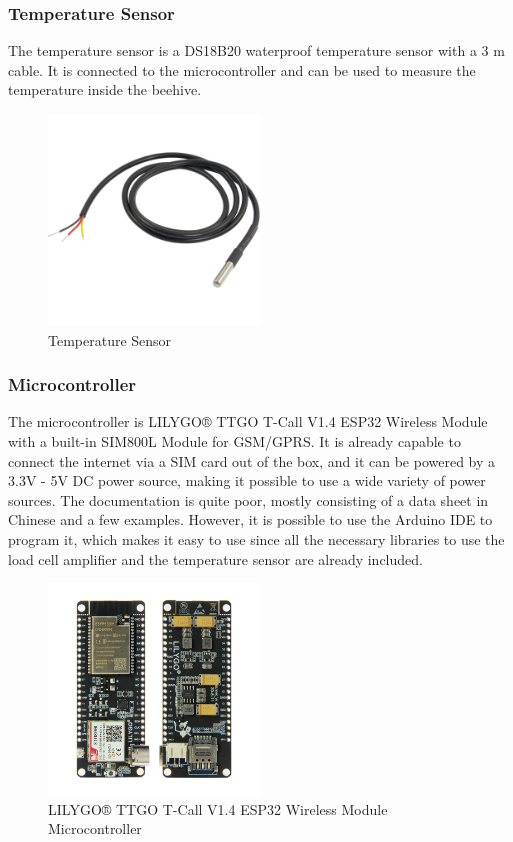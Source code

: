 \newpage
\subsubsection{Temperature Sensor}
The temperature sensor is a DS18B20 waterproof temperature sensor with a 3 m cable. It is connected to the microcontroller and can be used to measure the temperature inside the beehive.

\begin{figure}
    \centering
    \includegraphics[width=0.5\textwidth]{figures/DS18B20.png}
    \caption{Temperature Sensor}
    \label{fig:temperature_sensor}
\end{figure}
\newpage
\subsubsection{Microcontroller}
The microcontroller is LILYGO® TTGO T-Call V1.4 ESP32 Wireless Module with a built-in SIM800L Module for \Gls{GSM}/\Gls{GPRS}. It is already capable to connect the internet via a \Gls{SIM} card out of the box, and it can be powered by a 3.3V - 5V \Gls{DC} power source, making it possible to use a wide variety of power sources. The documentation is quite poor, mostly consisting of a data sheet in Chinese and a few examples. However, it is possible to use the \Gls{Arduino IDE} to program it, which makes it easy to use since all the necessary libraries to use the load cell amplifier and the temperature sensor are already included.

\begin{figure}
    \centering
    \includegraphics[width=0.5\textwidth]{figures/esp32.jpg}
    \caption{LILYGO® TTGO T-Call V1.4 ESP32 Wireless Module Microcontroller}
    \label{fig:esp32}
\end{figure}

